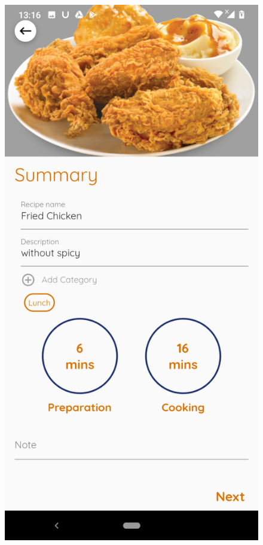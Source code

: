 \documentclass{article}
\begin{document}
\begin{figure}[h!]
    \includegraphics[scale=0.1]{Images/friechicken_order.jpg}

\end{figure}
\end{document}
